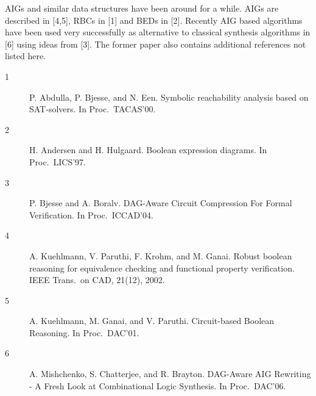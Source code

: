 \documentclass{llncs}
\begin{document}
  AIGs and similar data structures have been around for a while.  AIGs are
  described in [4,5], RBCs in [1] and BEDs in [2].  Recently AIG based
  algorithms have been used very successfully as alternative to classical
  synthesis algorithms in [6] using ideas from [3].  The former paper
  also contains additional references not listed here.

\begin{description}

\item
  [1] P. Abdulla, P. Bjesse, and N. Een.
  Symbolic reachability analysis based on SAT-solvers.
  In Proc.~TACAS'00.

\item
  [2] H. Andersen and H. Hulgaard. 
  Boolean expression diagrams.
  In Proc.~LICS'97.

\item
  [3] P. Bjesse and A. Boralv.
  DAG-Aware Circuit Compression For Formal Verification.
  In Proc.~ICCAD'04.

\item
  [4] A. Kuehlmann, V. Paruthi, F. Krohm, and M. Ganai.
  Robust boolean reasoning for equivalence checking and functional 
  property verification.
  IEEE Trans.~on CAD, 21(12), 2002. 

\item
  [5] A. Kuehlmann, M. Ganai, and V. Paruthi. 
  Circuit-based Boolean Reasoning. 
  In Proc.~DAC'01.

\item
  [6] A. Mishchenko, S. Chatterjee, and R. Brayton. 
  DAG-Aware AIG Rewriting - A Fresh Look at Combinational Logic Synthesis. 
  In Proc.~DAC'06. 

\end{description}
\end{document}
